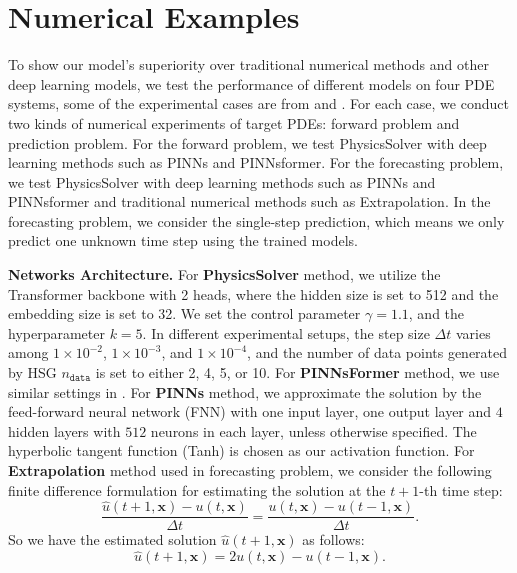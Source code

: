 \documentclass[preprint,11pt]{elsarticle}
\newcommand{\bx}{\boldsymbol{x}}
\begin{document}
\section{Numerical Examples}
\label{sec: numerical}

To show our model's superiority over traditional numerical methods and other deep learning models, we test the performance of different models on four PDE systems, some of the experimental cases are from \cite{raissi2019physics} and \cite{zhao2023pinnsformer}. For each case, we conduct two kinds of numerical experiments of target PDEs: forward problem and prediction problem. For the forward problem, we test PhysicsSolver with deep learning methods such as PINNs and PINNsformer. For the forecasting problem, we test PhysicsSolver with deep learning methods such as PINNs and PINNsformer and traditional numerical methods such as Extrapolation. In the forecasting problem, we consider the single-step prediction, which means we only predict one unknown time step using the trained models.

\textbf{Networks Architecture.} For \textbf{PhysicsSolver} method, we utilize the Transformer backbone with 2 heads, where the hidden size is set to 512 and the embedding size is set to 32. We set the control parameter $\gamma = 1.1$, and the hyperparameter $k=5$. In different experimental setups, the step size $\Delta t$ varies among $1 \times 10^{-2}$, $1 \times 10^{-3}$, and $1 \times 10^{-4}$, and the number of data points generated by HSG $n_{\texttt{data}}$ is set to either 2, 4, 5, or 10. For \textbf{PINNsFormer} method, we use similar settings in \cite{zhao2023pinnsformer}. For \textbf{PINNs} method, we approximate the solution by the feed-forward neural network (FNN) with one input layer, one output layer and $4$ hidden layers with $512$ neurons in each layer, unless otherwise specified. The hyperbolic tangent function (Tanh) is chosen as our activation function. For \textbf{Extrapolation} method used in forecasting problem, we consider the following finite difference formulation for estimating the solution at the $t+1$-th time step:
\begin{equation}
    \frac{\hat{u}(t+1,\bx)-u(t,\bx)}{\Delta t} = \frac{u(t,\bx)-u(t-1,\bx)}{\Delta t}.
\end{equation}
So we have the estimated solution $\hat{u}(t+1, \bx)$ as follows:
\begin{equation}
    \hat{u}(t+1,\bx) = 2u(t,\bx)-u(t-1,\bx).
\end{equation}
\end{document}
